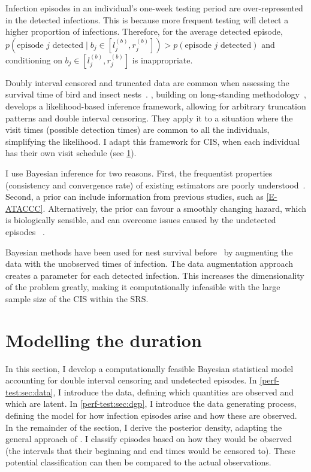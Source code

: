 \documentclass[thesis.tex]{subfiles}
\begin{document}
Infection episodes in an individual's one-week testing period are over-represented in the detected infections.
This is because more frequent testing will detect a higher proportion of infections.
Therefore, for the average detected episode, $p(\text{episode $j$ detected} \mid b_j \in [l_j^{(b)}, r_j^{(b)}]) > p(\text{episode $j$ detected})$ and conditioning on $b_j \in [l_j^{(b)}, r_j^{(b)}]$ is inappropriate.

Doubly interval censored and truncated data are common when assessing the survival time of bird and insect nests~\autocite{heiseyABCs}.
\textcite{heiseyModelling}, building on long-standing methodology~\autocite{dempsterMaximum,turnbullEmpirical}, develops a likelihood-based inference framework, allowing for arbitrary truncation patterns and double interval censoring.
They apply it to a situation where the visit times (possible detection times) are common to all the individuals, simplifying the likelihood.
I adapt this framework for CIS, when each individual has their own visit schedule (see \cref{perf-test:sec:model}).

I use Bayesian inference for two reasons.
First, the frequentist properties (\eg consistency and convergence rate) of existing estimators are poorly understood~\autocite{sunAnalysis,dengNonparametric}.
Second, a prior can include information from previous studies, such as \cref{E-ATACCC}.
Alternatively, the prior can favour a smoothly changing hazard, which is biologically sensible, and can overcome issues caused by the undetected episodes ~\autocite{caoBias}.

Bayesian methods have been used for nest survival before~\autocite{heBayesiana,heBayesian,caoModeling} by augmenting the data with the unobserved times of infection.
The data augmentation approach creates a parameter for each detected infection.
This increases the dimensionality of the problem greatly, making it computationally infeasible with the large sample size of the CIS within the SRS.


\section{Modelling the duration}\label{perf-test:sec:model}

In this section, I develop a computationally feasible Bayesian statistical model accounting for double interval censoring and undetected episodes.
In \cref{perf-test:sec:data}, I introduce the data, defining which quantities are observed and which are latent.
In \cref{perf-test:sec:dgp}, I introduce the data generating process, defining the model for how infection episodes arise and how these are observed.
In the remainder of the section, I derive the posterior density, adapting the general approach of \textcite{heiseyModelling}.
I classify episodes based on how they would be observed (\ie the intervals that their beginning and end times would be censored to).
These potential classification can then be compared to the actual observations.
\end{document}
